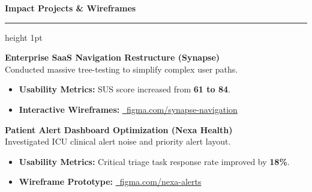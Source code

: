 \documentclass[10pt]{article}
\newcommand{\resumesection}[1]{%
  \vspace{6pt}%
  {\large\bfseries\color{primary} #1}%
  \vspace{2pt}%
  {\color{divider}\hrule height 1pt}%
  \vspace{4pt}%
}
\begin{document}
\begin{minipage}[t]{0.58\textwidth}
  \resumesection{Impact Projects \& Wireframes}
  
  \textbf{Enterprise SaaS Navigation Restructure (Synapse)} \\
  Conducted massive tree-testing to simplify complex user paths.
  \begin{itemize}
    \item \textbf{Usability Metrics:} SUS score increased from \textbf{61 to 84}.
    \item \textbf{Interactive Wireframes:} \href{https://figma.com/file/fictional-synapse-navigation}{\color{secondary}\faLink~figma.com/synapse-navigation}
  \end{itemize}
  
  \vspace{4pt}
  
  \textbf{Patient Alert Dashboard Optimization (Nexa Health)} \\
  Investigated ICU clinical alert noise and priority alert layout.
  \begin{itemize}
    \item \textbf{Usability Metrics:} Critical triage task response rate improved by \textbf{18\%}.
    \item \textbf{Wireframe Prototype:} \href{https://figma.com/file/fictional-nexa-alerts}{\color{secondary}\faLink~figma.com/nexa-alerts}
  \end{itemize}
\end{minipage}%
\hfill%
\end{document}
